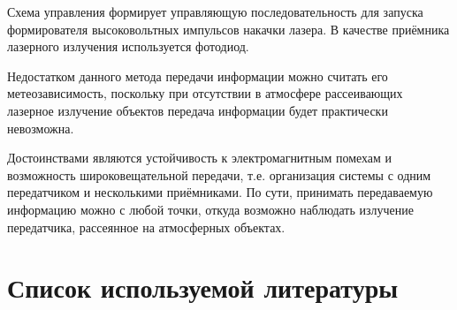 \documentclass[14pt,pscyr,titlepage]{hedreport}
\begin{document}
		Схема управления формирует управляющую последовательность для запуска 
		формирователя высоковольтных импульсов накачки лазера. В качестве 
		приёмника лазерного излучения используется фотодиод.

		Недостатком данного метода передачи информации можно считать его 
		метеозависимость, поскольку при отсутствии в атмосфере рассеивающих 
		лазерное излучение объектов передача информации будет практически 
		невозможна.

		Достоинствами являются устойчивость к электромагнитным помехам и 
		возможность широковещательной передачи, т.е. организация системы с 
		одним передатчиком и несколькими приёмниками. По сути, принимать 
		передаваемую информацию можно с любой точки, откуда возможно 
		наблюдать излучение передатчика, рассеянное на атмосферных объектах. 
	
	\pagebreak
	\section{Список используемой литературы}
\end{document}
